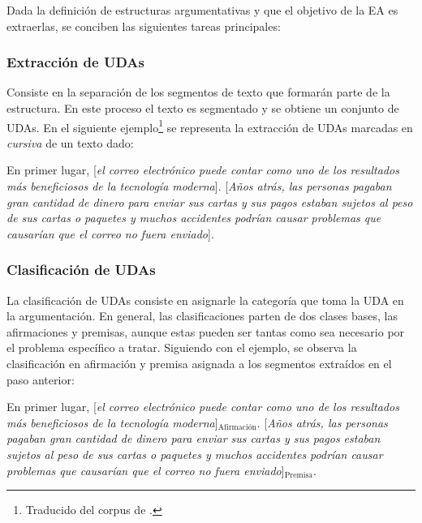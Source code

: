 \documentclass[a4paper,11pt,twocolumn,twoside]{article}
\begin{document}
Dada la definición de estructuras argumentativas y que el objetivo de la EA es extraerlas,
se conciben las siguientes tareas principales:

\subsubsection{Extracción de UDAs}

Consiste en la separación de los segmentos de texto que formarán parte de la estructura.
En este proceso el texto es segmentado y se obtiene un conjunto de UDAs. En el siguiente 
ejemplo\footnote{Traducido del corpus de
	\cite{stab2017parsing}
	.} se representa 
la extracción de UDAs marcadas en \textit{cursiva} de un texto dado:

\begin{adjustwidth}{25pt}{25pt}
	En primer lugar, [\textit{el correo electrónico puede contar como uno de los resultados
				más beneficiosos de la tecnología moderna}]. [\textit{Años atrás, las personas pagaban gran cantidad de dinero para
		enviar sus cartas y sus pagos estaban sujetos al peso de sus cartas o paquetes y muchos accidentes podrían 
		causar problemas que causarían que el correo no fuera enviado}].
\end{adjustwidth}

\subsubsection{Clasificación de UDAs}

La clasificación de UDAs consiste en asignarle la categoría que toma la UDA en la argumentación. En general, 
las clasificaciones parten de dos clases bases, las afirmaciones y premisas, aunque estas pueden ser tantas
como sea necesario por el problema específico a tratar. Siguiendo con el ejemplo, se observa la clasificación
en afirmación y premisa asignada a los segmentos extraídos en el paso anterior:

\begin{adjustwidth}{25pt}{25pt}
	En primer lugar, [\textit{el correo electrónico puede contar como uno de los resultados
				más beneficiosos de la tecnología moderna}]$_{\mathrm{\text{Afirmación}}}$. [\textit{Años atrás, las personas pagaban gran cantidad de dinero para
				enviar sus cartas y sus pagos estaban sujetos al peso de sus cartas o paquetes y muchos accidentes podrían 
				causar problemas que causarían que el correo no fuera enviado}]$_{\mathrm{Premisa}}$.
\end{adjustwidth}
\end{document}
